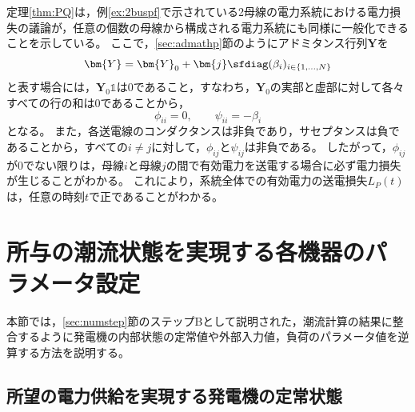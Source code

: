 \documentclass[tombow,dvipdfmx]{corona-a5-1.1}
\begin{document}
定理\ref{thm:PQ}は，例\ref{ex:2buspf}で示されている2母線の電力系統における電力損失の議論が，任意の個数の母線から構成される電力系統にも同様に一般化できることを示している。
ここで，\ref{sec:admathp}節のようにアドミタンス行列$\bm{Y}$を
\[
\bm{Y}=\bm{Y}_0 + \bm{j} \sfdiag(\beta_i)_{i\in \{1,\ldots,N\} }
\]
と表す場合には，$\bm{Y}_0 \mathds{1}$は0であること，すなわち，$\bm{Y}_0$の実部と虚部に対して各々すべての行の和は0であることから，
\[
\phi_{ii}=0,\qquad
\psi_{ii}= - \beta_i
\]
となる。
また，各送電線のコンダクタンスは非負であり，サセプタンスは負であることから，すべての$i\neq j$に対して，$\phi_{ij} $と$\psi_{ij}$は非負である。
したがって，$\phi_{ij}$が0でない限りは，母線$i$と母線$j$の間で有効電力を送電する場合に必ず電力損失が生じることがわかる。
これにより，系統全体での有効電力の送電損失$L_P(t)$は，任意の時刻$t$で正であることがわかる。


\section{所与の潮流状態を実現する各機器のパラメータ設定}\label{sec:paradef}

本節では，\ref{sec:numstep}節のステップBとして説明された，潮流計算の結果に整合するように発電機の内部状態の定常値や外部入力値，負荷のパラメータ値を逆算する方法を説明する。


\subsection{所望の電力供給を実現する発電機の定常状態}\label{sec:stagen}
\end{document}
